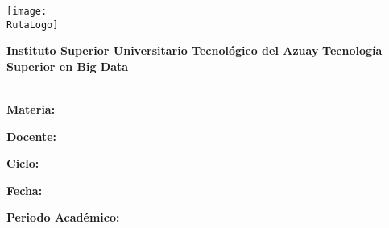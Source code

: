 \begin{titlepage}

    \centering

    \texttt{[image: \\RutaLogo]} 

    \vspace{0.3cm}
    \textcolor{azul}{\Large \textbf{Instituto Superior Universitario Tecnológico del Azuay}}
    \textcolor{azul}{\Large \textbf{Tecnología Superior en Big Data}}
    
    
    {\Large\textbf{\Tema}}
    
    \textcolor{azul}{\large \textbf{\EtiquetaAutores} \\}
    \vspace{0.3cm}
    {\large \Alumno}
    \textcolor{azul}{\large \textbf{Materia:} \\}
    \vspace{0.3cm}
    {\large \Materia}


    \textcolor{azul}{\large \textbf{Docente:} \\}
    \vspace{0.3cm}
    {\large \Docente}


    \textcolor{azul}{\large \textbf{Ciclo:} \\}
    \vspace{0.3cm}
    {\large \Ciclo}


    \textcolor{azul}{\large \textbf{Fecha:} \\}
    \vspace{0.3cm}
    {\large \Fecha}

    \textcolor{azul}{\large \textbf{Periodo Académico:} \\}
    \vspace{0.3cm}
    {\large \Periodo}
 
\end{titlepage}
